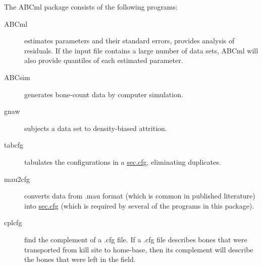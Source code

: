 The ABCml package consists of the following programs:
\begin{description}
\item[ABCml] estimates parameters and their standard errors, provides analysis
  of residuals.  If the input file contains a large number of data sets, ABCml
  will also provide quantiles of each estimated parameter.

\item[ABCsim] generates bone-count data by computer simulation.

\item[gnaw] subjects a data set to density-biased attrition.

\item[tabcfg] tabulates the configurations in a 
\hyperref{.cfg file}{.cfg file (see Section~}{)}{sec.cfg}, eliminating
  duplicates. 
  
\item[mau2cfg] converts data from .mau format (which is common in published
  literature) into \hyperref{.cfg format}{.cfg format}{}{sec.cfg} (which is
  required by several of the programs in this package).

\item[cplcfg] find the complement of a .cfg file.  If a .cfg file describes
  bones that were transported from kill site to home-base, then its complement
  will describe the bones that were left in the field.
\end{description}

